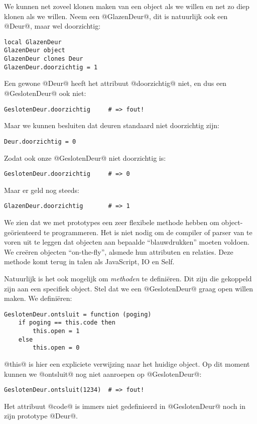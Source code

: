 We kunnen net zoveel klonen maken van een object als we willen en net zo diep klonen als we willen. Neem een @GlazenDeur@, dit is natuurlijk ook een @Deur@, maar wel doorzichtig:
\begin{lstlisting}[name=deuren]
local GlazenDeur
GlazenDeur object
GlazenDeur clones Deur
GlazenDeur.doorzichtig = 1
\end{lstlisting}
Een gewone @Deur@ heeft het attribuut @doorzichtig@ niet, en dus een @GeslotenDeur@ ook niet:
\begin{lstlisting}[name=deuren]
GeslotenDeur.doorzichtig     # => fout!
\end{lstlisting}
Maar we kunnen besluiten dat deuren standaard niet doorzichtig zijn:
\begin{lstlisting}[name=deuren]
Deur.doorzichtig = 0
\end{lstlisting}
Zodat ook onze @GeslotenDeur@ niet doorzichtig is:
\begin{lstlisting}[name=deuren]
GeslotenDeur.doorzichtig     # => 0
\end{lstlisting}
Maar er geld nog steeds:
\begin{lstlisting}[name=deuren]
GlazenDeur.doorzichtig       # => 1
\end{lstlisting}

We zien dat we met prototypes een zeer flexibele methode hebben om object-geörienteerd te programmeren. Het is niet nodig om de compiler of parser van te voren uit te leggen dat objecten aan bepaalde \enquote{blauwdrukken} moeten voldoen. We creëren objecten \enquote{on-the-fly}, alsmede hun attributen en relaties. Deze methode komt terug in talen als JavaScript, IO en Self.

Natuurlijk is het ook mogelijk om \emph{methoden} te definiëren. Dit zijn   die gekoppeld zijn aan een specifiek object. Stel dat we een @GeslotenDeur@ graag open willen maken. We definiëren:

\begin{lstlisting}[name=deuren]
GeslotenDeur.ontsluit = function (poging)
    if poging == this.code then
        this.open = 1
    else
        this.open = 0
\end{lstlisting}
@this@ is hier een expliciete verwijzing naar het huidige object. Op dit moment kunnen we @ontsluit@ nog niet aanroepen op @GeslotenDeur@:
\begin{lstlisting}[name=deuren]
GeslotenDeur.ontsluit(1234)  # => fout!
\end{lstlisting}
Het attribuut @code@ is immers niet gedefinieerd in @GeslotenDeur@ noch in zijn prototype @Deur@.

